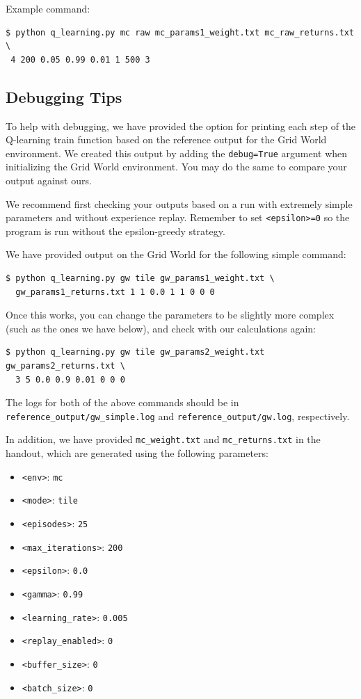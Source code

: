 \documentclass[11pt,addpoints,answers]{exam}
\begin{document}
Example command:
\begin{lstlisting}[language=Shell]
$ python q_learning.py mc raw mc_params1_weight.txt mc_raw_returns.txt \ 
 4 200 0.05 0.99 0.01 1 500 3
\end{lstlisting}

\subsection{Debugging Tips}\label{subsec:debugging}

To help with debugging, we have provided the option for printing each step of the Q-learning train function based on the reference output for the Grid World environment. We created this output by adding the \texttt{debug=True} argument when initializing the Grid World environment. You may do the same to compare your output against ours.

We recommend first checking your outputs based on a run with extremely simple parameters and without experience replay. Remember to set \texttt{<epsilon>=0} so the program is run without the epsilon-greedy strategy.

We have provided output on the Grid World for the following simple command:

\begin{lstlisting}[language=Shell]
$ python q_learning.py gw tile gw_params1_weight.txt \
  gw_params1_returns.txt 1 1 0.0 1 1 0 0 0
\end{lstlisting}

Once this works, you can change the parameters to be slightly more complex (such as the ones we have below), and check with our calculations again:

\begin{lstlisting}[language=Shell]
$ python q_learning.py gw tile gw_params2_weight.txt gw_params2_returns.txt \
  3 5 0.0 0.9 0.01 0 0 0
\end{lstlisting}

The logs for both of the above commands should be in \texttt{reference\_output/gw\_simple.log} and \texttt{reference\_output/gw.log}, respectively.

In addition, we have provided \texttt{mc\_weight.txt} and \texttt{mc\_returns.txt} in the handout, which are generated using the following parameters:
\begin{itemize}
    \item \texttt{<env>}: \texttt{mc}
    \item \texttt{<mode>}: \texttt{tile}
    \item \texttt{<episodes>}: \texttt{25}
    \item \texttt{<max\_iterations>}: \texttt{200}
    \item \texttt{<epsilon>}: \texttt{0.0}
    \item \texttt{<gamma>}: \texttt{0.99}
    \item \texttt{<learning\_rate>}: \texttt{0.005}
    \item \texttt{<replay\_enabled>}: \texttt{0}
    \item \texttt{<buffer\_size>}: \texttt{0}
    \item \texttt{<batch\_size>}: \texttt{0}
\end{itemize}
\end{document}
